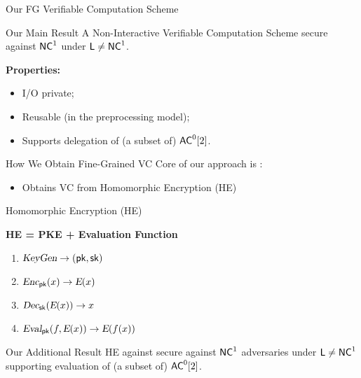 \begin{frame}{Our FG Verifiable Computation Scheme}

\begin{block}{Our Main Result}
	A Non-Interactive Verifiable Computation Scheme secure against ${\mathsf{NC}}^1$ under ${\mathsf{L}} \not = {\mathsf{NC}}^1$.
\end{block}
\pause
\textbf{Properties:}
\begin{itemize}[<+- | alert@+>]
	\item I/O private;
	\item Reusable (in the preprocessing model);
	\item Supports delegation of (a subset of) ${\mathsf{AC}}^0[2]$.
\end{itemize}
\end{frame}


\begin{frame}{How We Obtain Fine-Grained VC}
	Core of our approach is \cite{ckv10}:
	\begin{itemize}
		\item  Obtains VC from Homomorphic Encryption (HE)
	\end{itemize}
\end{frame}

\def\E{\func{E}}

\begin{frame}{Homomorphic Encryption (HE)}
	\begin{center} \textbf{HE = PKE + Evaluation Function} \end{center}
	\begin{enumerate}
		\item ${\textsl{KeyGen}} \to (\mathsf{pk}, \mathsf{sk})$
		\item $\func{Enc}_{\pk}(x) \to \E(x)$
		\item $\func{Dec}_{\sk}(\E(x)) \to x$
		\pause  
		\item $\func{Eval}_{\pk}(f, \E(x)) \to \E(f(x))$
	\end{enumerate}
	\pause
	\bigskip
	\begin{block}{Our Additional Result}
		HE against secure against ${\mathsf{NC}}^1$ adversaries under ${\mathsf{L}} \not = {\mathsf{NC}}^1$ supporting evaluation of (a subset of) ${\mathsf{AC}}^0[2]$.
	\end{block}
\end{frame}

